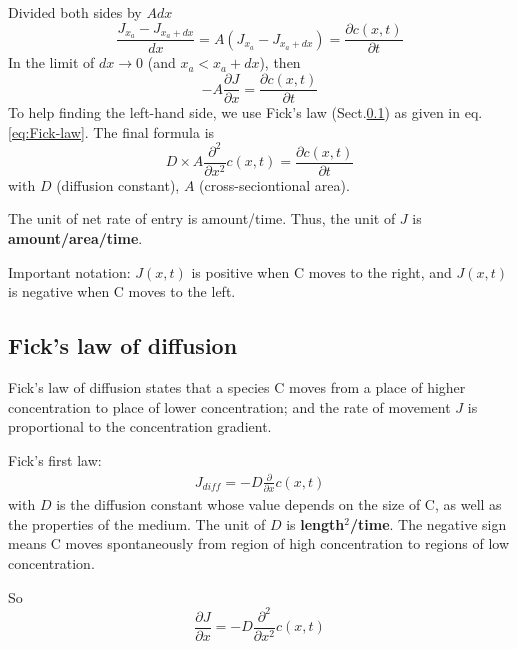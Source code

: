 Divided both sides by $Adx$
\begin{equation}
\frac{J_{x_a} - J_{x_a+dx}}{dx} = A (J_{x_a}-J_{x_a+dx}) = \frac{\partial
c(x,t)}{\partial t}
\end{equation}
In the limit of $dx \rightarrow 0$ (and $x_a < x_a+dx$), then
\begin{equation}
-A\frac{\partial J}{\partial x} = \frac{\partial
c(x,t)}{\partial t}
\end{equation}
To help finding the left-hand side, we use Fick's law
(Sect.\ref{sec:ficks-law-diffusion}) as given in eq.\ref{eq:Fick-law}.
The final formula is
\begin{equation}
D \times A \frac{\partial^2}{\partial x^2} c(x,t)= \frac{\partial
c(x,t)}{\partial t}
\end{equation}
with $D$ (diffusion constant), $A$ (cross-seciontional area).
 
\begin{framed}
The unit of net rate of entry is amount/time. Thus, the unit of $J$ is
{\bf amount/area/time}.

Important notation: $J(x,t)$ is positive when C moves to the right,
and $J(x,t)$ is negative when C moves to the left. 
\end{framed}

\subsection{Fick's law of diffusion}
\label{sec:ficks-law-diffusion}

Fick's law of diffusion states that a species C moves from a place of
higher concentration to place of lower concentration; and the rate of
movement $J$ is proportional to the concentration gradient.

Fick's first law:
\begin{eqnarray}
  \label{eq:406}
  J_{diff} = -D \frac{\partial}{\partial x} c(x,t)
\end{eqnarray}
with $D$ is the diffusion constant whose value depends on the size of
C, as well as the properties of the medium. The unit of $D$ is
{\bf length$^2$/time}. The negative sign means C moves spontaneously
from region of high concentration to regions of low concentration. 

So
\begin{equation}
\label{eq:Fick-law}
\frac{\partial J}{\partial x} = -D \frac{\partial^2}{\partial
x^2} c(x,t)
\end{equation}

